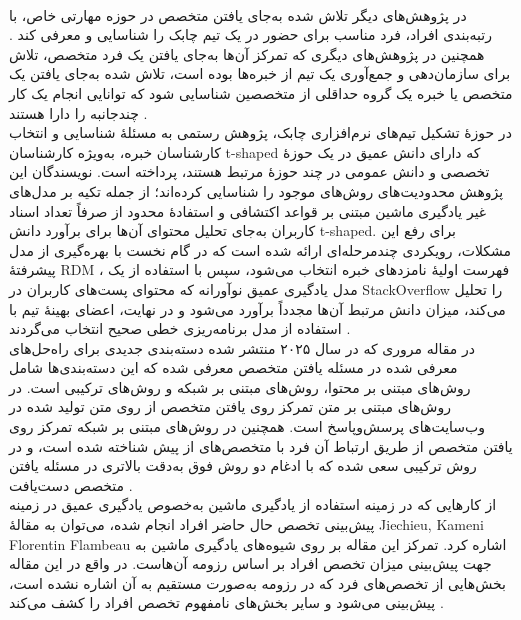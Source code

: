 \\
 در پژوهش‌های دیگر تلاش شده به‌جای یافتن متخصص در حوزه مهارتی خاص، با رتبه‌بندی افراد، فرد مناسب برای حضور در یک تیم چابک را شناسایی و معرفی کند 
   \cite{rostami_t-shaped_2019}
   \cite{sotudeh_gharebagh_t-shaped_2018}. همچنین در پژوهش‌های دیگری که تمرکز آن‌ها به‌جای یافتن یک فرد متخصص، تلاش برای سازمان‌دهی و جمع‌آوری یک تیم از خبره‌ها بوده است، تلاش شده به‌جای یافتن یک متخصص یا خبره یک گروه حداقلی از متخصصین شناسایی شود که توانایی انجام یک کار چندجانبه را دارا هستند \cite{neshati_expert_2014}. 
\\
در حوزهٔ تشکیل تیم‌های نرم‌افزاری چابک، پژوهش رستمی به مسئلهٔ شناسایی و انتخاب کارشناسان خبره، به‌ویژه کارشناسان t-shaped  که دارای دانش عمیق در یک حوزهٔ تخصصی و دانش عمومی در چند حوزهٔ مرتبط هستند، پرداخته است. نویسندگان این پژوهش محدودیت‌های روش‌های موجود را شناسایی کرده‌اند؛ از جمله تکیه بر مدل‌های غیر یادگیری ماشین مبتنی بر قواعد اکتشافی و استفادهٔ محدود از صرفاً تعداد اسناد کاربران به‌جای تحلیل محتوای آن‌ها برای برآورد دانش t-shaped. برای رفع این مشکلات، رویکردی چندمرحله‌ای ارائه شده است که در گام نخست با بهره‌گیری از مدل پیشرفتهٔ RDM  ، فهرست اولیهٔ نامزدهای خبره انتخاب می‌شود، سپس با استفاده از یک مدل یادگیری عمیق نوآورانه که محتوای پست‌های کاربران در StackOverflow را تحلیل می‌کند، میزان دانش مرتبط آن‌ها مجدداً برآورد می‌شود و در نهایت، اعضای بهینهٔ تیم با استفاده از مدل برنامه‌ریزی خطی صحیح انتخاب می‌گردند\cite{rostami_deep_2023} .
\\
 در مقاله مروری که در سال ۲۰۲۵ منتشر شده دسته‌بندی جدیدی برای راه‌حل‌های معرفی شده در مسئله یافتن متخصص معرفی شده که این دسته‌بندی‌ها شامل روش‌های مبتنی بر محتوا، روش‌های مبتنی بر شبکه و روش‌های ترکیبی است. در روش‌های مبتنی بر متن تمرکز روی یافتن متخصص از روی متن تولید شده در وب‌سایت‌های پرسش‌وپاسخ است. همچنین در روش‌های مبتنی بر شبکه تمرکز روی یافتن متخصص از طریق ارتباط آن فرد با متخصص‌های از پیش شناخته شده است، و در روش ترکیبی سعی شده که با ادغام دو روش فوق به‌دقت بالاتری در مسئله یافتن متخصص دست‌یافت \cite{azimi_expert_2025}.
\\
 از کارهایی که در زمینه استفاده از یادگیری ماشین به‌خصوص یادگیری عمیق در زمینه پیش‌بینی تخصص حال حاضر افراد انجام شده، می‌توان به مقالۀ Jiechieu, Kameni Florentin Flambeau اشاره کرد. تمرکز این مقاله بر روی شیوه‌های یادگیری ماشین به جهت پیش‌بینی میزان تخصص افراد بر اساس رزومه آن‌هاست. در واقع در این مقاله بخش‌هایی از تخصص‌های فرد که در رزومه به‌صورت مستقیم به آن اشاره نشده است، پیش‌بینی می‌شود و سایر بخش‌های نامفهوم تخصص افراد را کشف می‌کند \cite{jiechieu_skills_2021}.
\\

